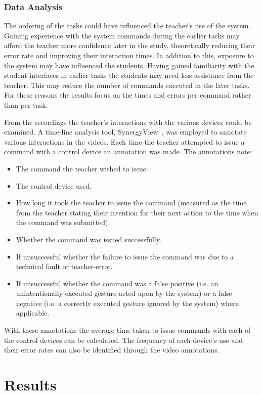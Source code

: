 \documentclass[link]{IWCOMP}
\begin{document}
\subsubsection{Data Analysis}
\label{subsec:studyAnalysis}

The ordering of the tasks could have influenced the teacher's use of the system.
Gaining experience with the system commands during the earlier tasks may afford the teacher more confidence later in the study, theoretically reducing their error rate and improving their interaction times.
In addition to this, exposure to the system may have influenced the students.
Having gained familiarity with the student interfaces in earlier tasks the students may need less assistance from the teacher.
This may reduce the number of commands executed in the later tasks.
For these reasons the results focus on the times and errors per command rather than per task.

From the recordings the teacher's interactions with the various devices could be examined.
A time-line analysis tool, SynergyView~\cite{Kyaw2011}, was employed to annotate various interactions in the videos.
Each time the teacher attempted to issue a command with a control device an annotation was made.
The annotations note:
\begin{itemize}
\item The command the teacher wished to issue.
\item The control device used.
\item How long it took the teacher to issue the command (measured as the time from the teacher stating their intention for their next action to the time when the command was submitted).
\item Whether the command was issued successfully.
\item If unsuccessful whether the failure to issue the command was due to a technical fault or teacher-error.
\item If unsuccessful whether the command was a false positive (i.e. an unintentionally executed gesture acted upon by the system) or a false negative (i.e. a correctly executed gesture ignored by the system) where applicable.
\end{itemize}
With these annotations the average time taken to issue commands with each of the control devices can be calculated.
The frequency of each device's use and their error rates can also be identified through the video annotations.

\section{Results}
\label{sec:results}
\end{document}
